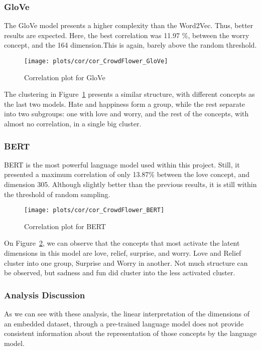 \subsubsection{GloVe}
The GloVe model presents a higher complexity than the Word2Vec. Thus, better results are expected. Here, the best correlation was 11.97 \%, between the worry concept, and the 164 dimension.This is again, barely above the random threshold.
\begin{figure}[H]
  \texttt{[image: plots/cor/cor\_CrowdFlower\_GloVe]}
  \centering
  \caption{Correlation plot for GloVe}\label{fig:cor_CrowdFlower_GloVe}
\end{figure}
The clustering in Figure~\ref{fig:cor_CrowdFlower_GloVe} presents a similar structure, with different concepts as the last two models. Hate and happiness form a group, while the rest separate into two subgroups: one with love and worry, and the rest of the concepts, with almost no correlation, in a single big cluster.

\subsubsection{BERT}
BERT is the most powerful language model used within this project. Still, it presented a maximum correlation of only 13.87\% between the love concept, and dimension 305. Although slightly better than the previous results, it is still within the threshold of random sampling.
\begin{figure}[H]
  \texttt{[image: plots/cor/cor\_CrowdFlower\_BERT]}
  \centering
  \caption{Correlation plot for BERT}\label{fig:cor_CrowdFlower_BERT}
\end{figure}
On Figure~\ref{fig:cor_CrowdFlower_BERT}, we can observe that the concepts that most activate the latent dimensions in this model are love, relief, surprise, and worry. Love and Relief cluster into one group, Surprise and Worry in another. Not much structure can be observed, but sadness and fun did cluster into the less activated cluster.

\subsubsection{Analysis Discussion}
As we can see with these analysis, the linear interpretation of the dimensions of an embedded dataset, through a pre-trained language model does not provide consistent information about the representation of those concepts by the language model.


